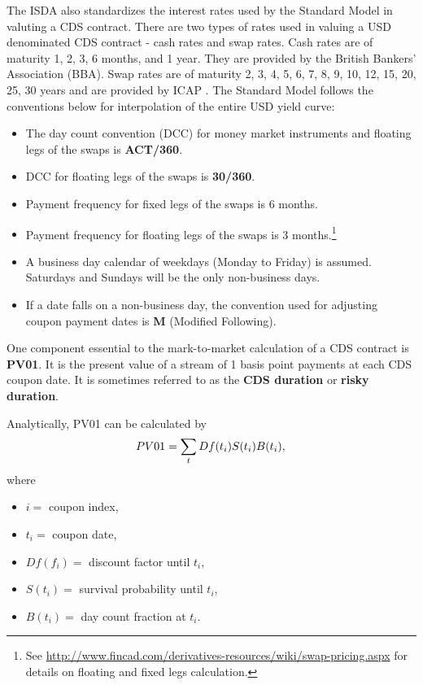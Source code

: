 \documentclass[a4paper]{article}
\begin{document}
The ISDA also standardizes the interest rates used by the Standard
Model in valuting a CDS contract. There are two types of rates used in
valuing a USD denominated CDS contract - cash rates and swap
rates. Cash rates are of maturity 1, 2, 3, 6 months, and 1 year. They
are provided by the British Bankers' Association (BBA). Swap rates are
of maturity 2, 3, 4, 5, 6, 7, 8, 9, 10, 12, 15, 20, 25, 30 years and
are provided by ICAP \citep{rates}. The Standard Model follows the
conventions below for interpolation of the entire USD yield
curve:
\begin{itemize}
\item The day count convention (DCC) for money market instruments and
  floating legs of the swaps is \textbf{ACT/360}.
\item DCC for floating legs of the swaps is \textbf{30/360}.
\item Payment frequency for fixed legs of the swaps is 6 months.
\item Payment frequency for floating legs of the swaps is 3
  months.\footnote{See
    \url{http://www.fincad.com/derivatives-resources/wiki/swap-pricing.aspx}
    for details on floating and fixed legs calculation.}
\item A business day calendar of weekdays (Monday to Friday) is
  assumed. Saturdays and Sundays will be the only non-business days.
\item If a date falls on a non-business day, the convention used for
  adjusting coupon payment dates is \textbf{M} (Modified Following).
\end{itemize}

One component essential to the mark-to-market calculation of a CDS
contract is \textbf{PV01}. It is the present value of a stream of 1
basis point payments at each CDS coupon date. It is sometimes referred
to as the \textbf{CDS duration} or \textbf{risky duration}.

Analytically, PV01 can be calculated by
\begin{displaymath}
PV01 =  \sum_tDf(t_i)S(t_i)B(t_i), \nonumber\\
\end{displaymath}
where 
\begin{itemize}
\item $i =$ coupon index,
\item $t_i =$ coupon date,
\item $Df(f_i) =$ discount factor until $t_i$,
\item $S(t_i) =$ survival probability until $t_i$,
\item $B(t_i) =$ day count fraction at $t_i$.
\end{itemize}
\end{document}
